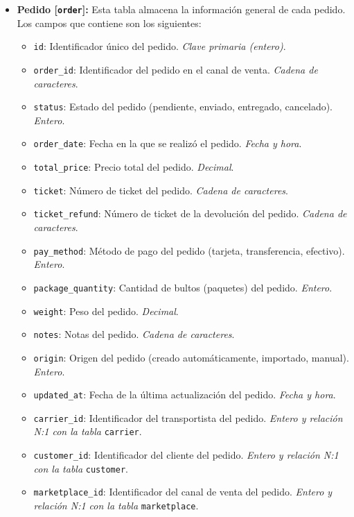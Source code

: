 \begin{itemize}
    \item \textbf{Pedido [\texttt{order}]:} Esta tabla almacena la información general de cada pedido. Los campos que contiene son los siguientes:
          \begin{itemize}
              \item \texttt{id}: Identificador único del pedido. \textit{Clave primaria (entero)}.
              \item \texttt{order\_id}: Identificador del pedido en el canal de venta. \textit{Cadena de caracteres}.
              \item \texttt{status}: Estado del pedido (pendiente, enviado, entregado, cancelado). \textit{Entero}.
              \item \texttt{order\_date}: Fecha en la que se realizó el pedido. \textit{Fecha y hora}.
              \item \texttt{total\_price}: Precio total del pedido. \textit{Decimal}.
              \item \texttt{ticket}: Número de ticket del pedido. \textit{Cadena de caracteres}.
              \item \texttt{ticket\_refund}: Número de ticket de la devolución del pedido. \textit{Cadena de caracteres}.
              \item \texttt{pay\_method}: Método de pago del pedido (tarjeta, transferencia, efectivo). \textit{Entero}.
              \item \texttt{package\_quantity}: Cantidad de bultos (paquetes) del pedido. \textit{Entero}.
              \item \texttt{weight}: Peso del pedido. \textit{Decimal}.
              \item \texttt{notes}: Notas del pedido. \textit{Cadena de caracteres}.
              \item \texttt{origin}: Origen del pedido (creado automáticamente, importado, manual). \textit{Entero}.
              \item \texttt{updated\_at}: Fecha de la última actualización del pedido. \textit{Fecha y hora}.
              \item \texttt{carrier\_id}: Identificador del transportista del pedido. \textit{Entero y relación N:1 con la tabla} \texttt{carrier}.
              \item \texttt{customer\_id}: Identificador del cliente del pedido. \textit{Entero y relación N:1 con la tabla} \texttt{customer}.
              \item \texttt{marketplace\_id}: Identificador del canal de venta del pedido. \textit{Entero y relación N:1 con la tabla} \texttt{marketplace}.

\end{itemize}
\end{itemize}
